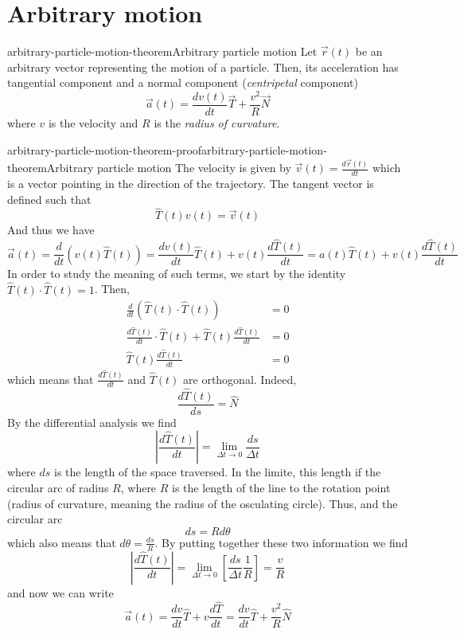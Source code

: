 \documentclass[preview]{standalone}
\begin{document}
\genpage

\section{Arbitrary motion}

\begin{snippettheorem}{arbitrary-particle-motion-theorem}{Arbitrary particle motion}
    Let \(\vec{r}(t)\) be an arbitrary vector representing the motion of a particle.
    Then, its acceleration has tangential component and a normal component (\emph{centripetal} component)
    \[
        \vec{a}(t) = \frac{dv(t)}{dt}\vec{T} + \frac{v^2}{R}\vec{N}
    \]
    where \(v\) is the velocity and \(R\) is the \emph{radius of curvature}.
\end{snippettheorem}

\begin{snippetproof}{arbitrary-particle-motion-theorem-proof}{arbitrary-particle-motion-theorem}{Arbitrary particle motion}
    The velocity is given by \(\vec{v}(t) = \frac{d\vec{r}(t)}{dt}\) which is a vector pointing in the direction of the trajectory.
    The tangent vector is defined such that
    \[
        \hat{T}(t) v(t) = \vec{v}(t)
    \]
    And thus we have
    \[
        \vec{a}(t) = \frac{d}{dt} \left(v(t)\hat{T}(t)\right) = \frac{dv(t)}{dt}\hat{T}(t) + v(t)\frac{d\hat{T}(t)}{dt} = a(t)\hat{T}(t) + v(t)\frac{d\hat{T}(t)}{dt}
    \]
    In order to study the meaning of such terms, we start by the identity \(\hat{T}(t) \cdot \hat{T}(t) = 1\).
    Then,
    \begin{align*}
        \frac{d}{dt} \left( \hat{T}(t) \cdot \hat{T}(t) \right) &= 0 \\
        \frac{d\hat{T}(t)}{dt} \cdot \hat{T}(t) + \hat{T}(t)\frac{d\hat{T}(t)}{dt} &= 0 \\
        \hat{T}(t)\frac{d\hat{T}(t)}{dt} &= 0 
    \end{align*}
    which means that \(\frac{d\hat{T}(t)}{dt}\) and \(\hat{T}(t)\) are orthogonal.
    Indeed,
    \[
        \frac{d\hat{T}(t)}{ds} = \hat{N}
    \]
    By the differential analysis we find
    \[
        \left|\frac{d\hat{T}(t)}{dt}\right| = \lim_{\Delta t \to 0} \frac{ds}{\Delta t}
    \]
    where \(ds\) is the length of the space traversed. In the limite,
    this length if the circular arc of radius \(R\), where \(R\) is the length of the line to the rotation point (radius of curvature, meaning the radius of the osculating circle).
    Thus,
    and the circular arc
    \[
        ds = Rd\theta
    \]
    which also means that \(d\theta = \frac{ds}{R}\).
    By putting together these two information we find
    \[
        \left|\frac{d\hat{T}(t)}{dt}\right| = \lim_{\Delta t \to 0} \left[\frac{ds}{\Delta t} \frac{1}{R}\right] = \frac{v}{R}
    \]
    and now we can write
    \[
        \vec{a}(t) = \frac{dv}{dt}\hat{T} + v\frac{d\hat{T}}{dt} = \frac{dv}{dt}\hat{T} + \frac{v^2}{R} \hat{N}
    \]
\end{snippetproof}
\end{document}
